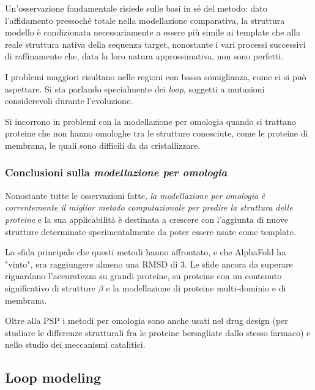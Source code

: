 {\par Un'osservazione fondamentale risiede sulle basi in sé del metodo: dato l'affidamento pressoché totale nella modellazione comparativa, la struttura modello è condizionata necessariamente a essere più simile ai template che alla reale struttura nativa della sequenza target, nonostante i vari processi successivi di raffinamento che, data la loro natura approssimativa, non sono perfetti. 

\par I problemi maggiori risultano nelle regioni con bassa somiglianza, come ci si può aspettare. Si sta parlando specialmente dei \textit{loop}, soggetti a mutazioni considerevoli durante l'evoluzione.

\par Si incorrono in problemi con la modellazione per omologia quando si trattano proteine che non hanno omologhe tra le strutture conosciute, come le proteine di membrana, le quali sono difficili da da cristallizzare. \\

\subsubsection{Conclusioni sulla \textit{modellazione per omologia}}

\par Nonostante tutte le osservazioni fatte, \textit{la modellazione per omologia è correntemente il miglior metodo computazionale per predire la struttura delle proteine} e la sua applicabilità è destinata a crescere con l'aggiunta di nuove strutture determinate sperimentalmente da poter essere usate come template.

\par La sfida principale che questi metodi hanno affrontato, e che AlphaFold ha "vinto", era raggiungere almeno una RMSD di 3\angstrom. Le sfide ancora da superare riguardano l'accuratezza su grandi proteine, su proteine con un contenuto significativo di strutture $\beta$ e la modellazione di proteine multi-dominio e di membrana.

\par Oltre alla PSP i metodi per omologia sono anche usati nel drug design (per studiare le differenze strutturali fra le proteine bersagliate dallo stesso farmaco) e nello studio dei meccanismi catalitici.

}

\subsection{Loop modeling} \label{sec: loop-modeling}

